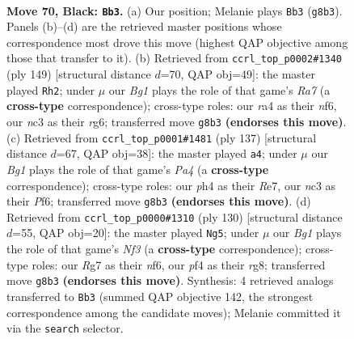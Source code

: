 \documentclass[11pt]{article}
\begin{document}
\clearpage

\begin{figure}[p]\centering
\begin{subfigure}{0.46\textwidth}\centering
\resizebox{\linewidth}{!}{%
\newchessgame
\chessboard[
  setfen={6b1/p1p1k1r1/P1p3p1/1rP2p1p/RP3P1P/2N3R1/5K2/8 b - - 63 70},
  showmover=false,
  pgfstyle=straightmove, color=movearrow, markmove={g8-b3}
]}
\caption{}
\end{subfigure}\hfill
\begin{subfigure}{0.46\textwidth}\centering
\resizebox{\linewidth}{!}{%
\newchessgame
\chessboard[
  setfen={3r3k/8/1p3NRp/p1p1p1n1/P1P1P1R1/1P6/r7/2K5 b - - 4 75},
  showmover=false,
  pgfstyle=straightmove, color=movearrow, markmove={a2-h2}
]}
\caption{}
\end{subfigure}
\\[4pt]
\begin{subfigure}{0.46\textwidth}\centering
\resizebox{\linewidth}{!}{%
\newchessgame
\chessboard[
  setfen={8/4r1k1/3r1p2/p1p4p/1p2PRpP/1P1P2P1/P2R4/5K2 b - - 3 69},
  showmover=false,
  pgfstyle=straightmove, color=movearrow, markmove={a5-a4}
]}
\caption{}
\end{subfigure}\hfill
\begin{subfigure}{0.46\textwidth}\centering
\resizebox{\linewidth}{!}{%
\newchessgame
\chessboard[
  setfen={6r1/1p1Pk3/p3pnr1/P4p1p/1P3P2/1K3NPR/4R3/8 w - - 0 66},
  showmover=false,
  pgfstyle=straightmove, color=movearrow, markmove={f3-g5}
]}
\caption{}
\end{subfigure}
\caption{\textbf{Move 70, Black: \texttt{Bb3}.} (a) Our position; Melanie plays \texttt{Bb3} (\texttt{g8b3}). Panels (b)--(d) are the retrieved master positions whose correspondence most drove this move (highest QAP objective among those that transfer to it). (b) Retrieved from \texttt{ccrl\_top\_p0002\#1340} (ply 149) [structural distance $d$=70, QAP obj=49]: the master played \texttt{Rh2}; under $\mu$ our \emph{Bg1} plays the role of that game's \emph{Ra7} (a \textbf{cross-type} correspondence); cross-type roles: our \emph{r}a4 as their \emph{n}f6, our \emph{n}c3 as their \emph{r}g6; transferred move \texttt{g8b3} \textbf{(endorses this move)}. (c) Retrieved from \texttt{ccrl\_top\_p0001\#1481} (ply 137) [structural distance $d$=67, QAP obj=38]: the master played \texttt{a4}; under $\mu$ our \emph{Bg1} plays the role of that game's \emph{Pa4} (a \textbf{cross-type} correspondence); cross-type roles: our \emph{p}h4 as their \emph{R}e7, our \emph{n}c3 as their \emph{P}f6; transferred move \texttt{g8b3} \textbf{(endorses this move)}. (d) Retrieved from \texttt{ccrl\_top\_p0000\#1310} (ply 130) [structural distance $d$=55, QAP obj=20]: the master played \texttt{Ng5}; under $\mu$ our \emph{Bg1} plays the role of that game's \emph{Nf3} (a \textbf{cross-type} correspondence); cross-type roles: our \emph{R}g7 as their \emph{n}f6, our \emph{p}f4 as their \emph{r}g8; transferred move \texttt{g8b3} \textbf{(endorses this move)}. Synthesis: 4 retrieved analogs transferred to \texttt{Bb3} (summed QAP objective 142, the strongest correspondence among the candidate moves); Melanie committed it via the \texttt{search} selector.}
\label{fig:thought-m139}
\end{figure}
\end{document}
